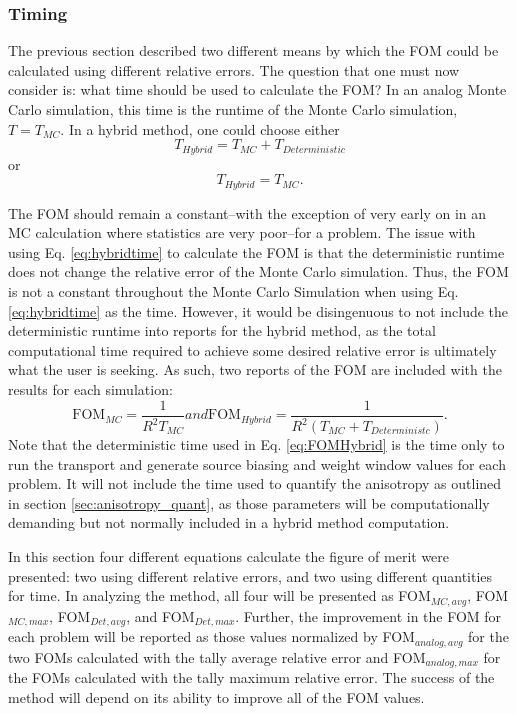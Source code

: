 \subsubsection{Timing}

The previous section described two different means by which the FOM could be
calculated using different relative errors. The question that one must
now consider is: what time should be used to
calculate the FOM? In an analog Monte Carlo simulation, this time is the runtime
of the Monte Carlo simulation, $T = T_{MC}$. In a hybrid method, one could choose
either
\begin{equation}
  T_{Hybrid} = T_{MC} + T_{Deterministic}
\label{eq:hybridtime}
\end{equation}
or
\begin{equation}
  T_{Hybrid} = T_{MC} .
\end{equation}

The FOM should remain a constant--with the exception of very early on in an MC
calculation where statistics are very poor--for a problem. The issue with using
Eq. \ref{eq:hybridtime} to calculate the FOM is that the deterministic runtime
does not change the relative error of the Monte Carlo simulation. Thus, the FOM
is not a constant throughout the Monte Carlo Simulation when using Eq.
\ref{eq:hybridtime} as the time.
However, it would be disingenuous to not include the deterministic runtime into
reports for the hybrid method, as the total computational time required to
achieve some desired relative error is ultimately what the user is seeking. As
such, two reports of the FOM are included with the results for each simulation:
\begin{subequations}
  \begin{equation}
    \text{FOM}_{MC} = \frac{1}{R^{2}T_{MC}}
  \label{eq:FOMMC}
  \end{equation}
and
  \begin{equation}
    \text{FOM}_{Hybrid} = \frac{1}{R^{2}(T_{MC} + T_{Deterministc})} .
  \label{eq:FOMHybrid}
  \end{equation}
  \label{eq:FOMtime}
\end{subequations}
Note that the deterministic time used in Eq. \ref{eq:FOMHybrid} is the time only
to run the transport and generate source biasing and weight window values for
each problem. It will not include the time used to quantify the anisotropy as
outlined in section \ref{sec:anisotropy_quant}, as those parameters will be
computationally demanding but not normally included in a hybrid method
computation.

In this section four different equations calculate the figure of merit were presented: two
using different relative errors, and two using different quantities
for time. In analyzing the method, all four will be presented as FOM$_{MC,avg}$,
FOM$_{MC,max}$, FOM$_{Det,avg}$, and FOM$_{Det,max}$. Further, the improvement
in the FOM for each problem will be reported as those values normalized by
FOM$_{analog,avg}$ for the two FOMs calculated with the tally average relative
error and FOM$_{analog,max}$ for the FOMs calculated with the tally maximum
relative error. The success of the method will depend on its ability to improve
all of the FOM values.

